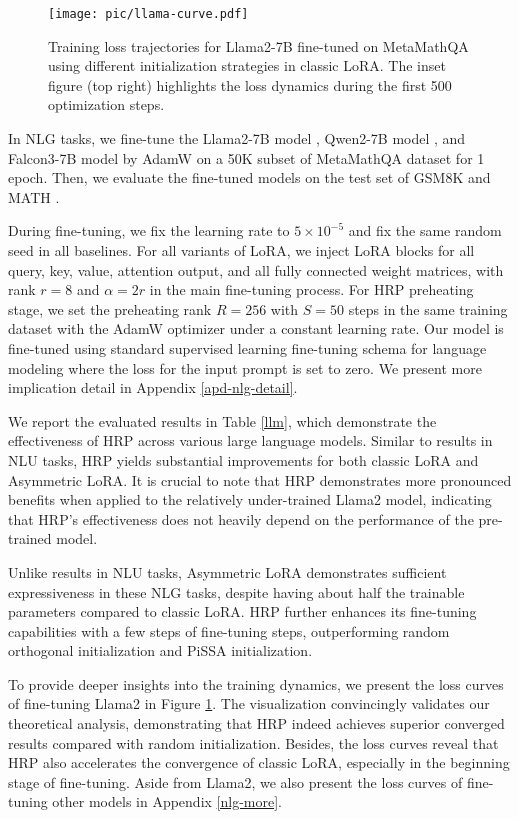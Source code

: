 \begin{figure}
    \centering
    \texttt{[image: pic/llama-curve.pdf]}
    \caption{Training loss trajectories for Llama2-7B fine-tuned on MetaMathQA using different initialization strategies in classic LoRA. The inset figure (top right) highlights the loss dynamics during the first 500 optimization steps.}
    \label{loss-curve}
\end{figure}

In NLG tasks, we fine-tune the Llama2-7B model \cite{touvron2023llama}, Qwen2-7B model \cite{qwen2}, and Falcon3-7B model \cite{Falcon3} by AdamW \cite{loshchilov2019decoupledweightdecayregularization} on a 50K subset of MetaMathQA dataset \cite{yu2023metamath} for 1 epoch. Then, we evaluate the fine-tuned models on the test set of GSM8K \cite{cobbe2021gsm8k} and MATH \cite{hendrycksmath2021}. 

During fine-tuning, we fix the learning rate to $5\times 10^{-5}$ and fix the same random seed in all baselines. For all variants of LoRA, we inject LoRA blocks for all query, key, value, attention output, and all fully connected weight matrices, with rank $r=8$ and $\alpha=2r$ in the main fine-tuning process. For HRP preheating stage, we set the preheating rank $R=256$ with $S=50$ steps in the same training dataset with the AdamW optimizer under a constant learning rate. Our model is fine-tuned using standard supervised learning fine-tuning schema for language modeling where the loss for the input prompt is set to zero. We present more implication detail in Appendix \ref{apd-nlg-detail}. 

We report the evaluated results in Table \ref{llm}, which demonstrate the effectiveness of HRP across various large language models. Similar to results in NLU tasks, HRP yields substantial improvements for both classic LoRA and Asymmetric LoRA. 
It is crucial to note that HRP demonstrates more pronounced benefits when applied to the relatively under-trained Llama2 model, indicating that HRP's effectiveness does not heavily depend on the performance of the pre-trained model. 

Unlike results in NLU tasks, Asymmetric LoRA demonstrates sufficient expressiveness in these NLG tasks, despite having about half the trainable parameters compared to classic LoRA. HRP further enhances its fine-tuning capabilities with a few steps of fine-tuning steps, outperforming random orthogonal initialization and PiSSA initialization. 

To provide deeper insights into the training dynamics, we present the loss curves of fine-tuning Llama2 in Figure \ref{loss-curve}. The visualization convincingly validates our theoretical analysis, demonstrating that HRP indeed achieves superior converged results compared with random initialization. Besides, the loss curves reveal that HRP also accelerates the convergence of classic LoRA, especially in the beginning stage of fine-tuning. Aside from Llama2, we also present the loss curves of fine-tuning other models in Appendix \ref{nlg-more}. 






